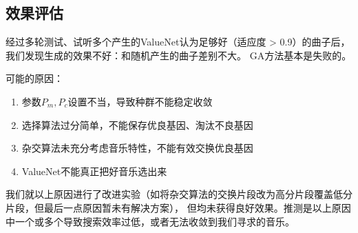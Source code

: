 \documentclass{ctexart}
\begin{document}
\subsection{效果评估}
经过多轮测试、试听多个产生的ValueNet认为足够好（适应度 > 0.9）的曲子后，我们发现生成的效果不好：和随机产生的曲子差别不大。
GA方法基本是失败的。

可能的原因：
\begin{enumerate}[nosep]
  \item 参数$P_m,P_c$设置不当，导致种群不能稳定收敛
  \item 选择算法过分简单，不能保存优良基因、淘汰不良基因
  \item 杂交算法未充分考虑音乐特性，不能有效交换优良基因
  \item ValueNet不能真正把好音乐选出来
\end{enumerate}

我们就以上原因进行了改进实验（如将杂交算法的交换片段改为高分片段覆盖低分片段，但最后一点原因暂未有解决方案），
但均未获得良好效果。推测是以上原因中一个或多个导致搜索效率过低，或者无法收敛到我们寻求的音乐。

\ifx\allfiles\undefined
\end{document}
